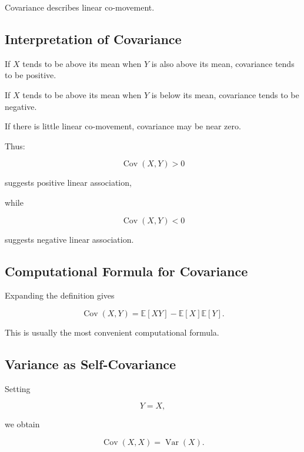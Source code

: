 Covariance describes linear co-movement.

\subsection{Interpretation of Covariance}
\label{subsec:covariance-interpretation}

If \(X\) tends to be above its mean when \(Y\) is also above its mean,
covariance tends to be positive.

If \(X\) tends to be above its mean when \(Y\) is below its mean,
covariance tends to be negative.

If there is little linear co-movement, covariance may be near zero.

Thus:

\[
\boxed{
\operatorname{Cov}(X,Y)>0
}
\]

suggests positive linear association,

while

\[
\boxed{
\operatorname{Cov}(X,Y)<0
}
\]

suggests negative linear association.

\subsection{Computational Formula for Covariance}
\label{subsec:covariance-computational}

Expanding the definition gives

\[
\boxed{
\operatorname{Cov}(X,Y)
=
\mathbb{E}[XY]
-
\mathbb{E}[X]\mathbb{E}[Y].
}
\]

This is usually the most convenient computational formula.

\subsection{Variance as Self-Covariance}
\label{subsec:variance-self-covariance}

Setting

\[
Y=X,
\]

we obtain

\[
\boxed{
\operatorname{Cov}(X,X)
=
\operatorname{Var}(X).
}
\]

